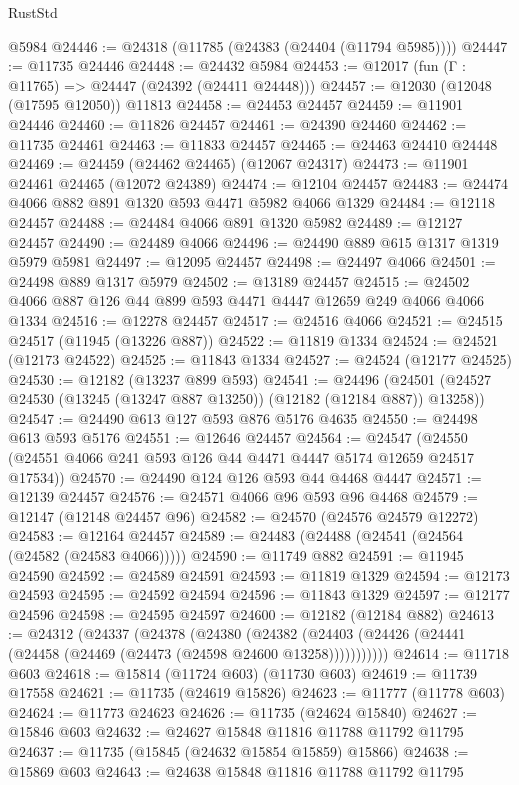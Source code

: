\begin{lexlean}{RustStd}
\begin{coremodule}
    @5984
@24446 := @24318 (@11785 (@24383 (@24404 (@11794 @5985))))
@24447 := @11735 @24446
@24448 := @24432 @5984
@24453 := @12017 (fun (Γ : @11765) => @24447 (@24392 (@24411 @24448)))
@24457 := @12030 (@12048 (@17595 @12050)) @11813
@24458 := @24453 @24457
@24459 := @11901 @24446
@24460 := @11826 @24457
@24461 := @24390 @24460
@24462 := @11735 @24461
@24463 := @11833 @24457
@24465 := @24463 @24410 @24448
@24469 := @24459 (@24462 @24465) (@12067 @24317)
@24473 := @11901 @24461 @24465 (@12072 @24389)
@24474 := @12104 @24457
@24483 := @24474 @4066 @882 @891 @1320 @593 @4471 @5982 @4066 @1329
@24484 := @12118 @24457
@24488 := @24484 @4066 @891 @1320 @5982
@24489 := @12127 @24457
@24490 := @24489 @4066
@24496 := @24490 @889 @615 @1317 @1319 @5979 @5981
@24497 := @12095 @24457
@24498 := @24497 @4066
@24501 := @24498 @889 @1317 @5979
@24502 := @13189 @24457
@24515 := @24502 @4066 @887 @126 @44 @899 @593 @4471 @4447 @12659 @249 @4066 @4066 @1334
@24516 := @12278 @24457
@24517 := @24516 @4066
@24521 := @24515 @24517 (@11945 (@13226 @887))
@24522 := @11819 @1334
@24524 := @24521 (@12173 @24522)
@24525 := @11843 @1334
@24527 := @24524 (@12177 @24525)
@24530 := @12182 (@13237 @899 @593)
@24541 := @24496
    (@24501 (@24527 @24530 (@13245 (@13247 @887 @13250)) (@12182 (@12184 @887)) @13258))
@24547 := @24490 @613 @127 @593 @876 @5176 @4635
@24550 := @24498 @613 @593 @5176
@24551 := @12646 @24457
@24564 := @24547 (@24550 (@24551 @4066 @241 @593 @126 @44 @4471 @4447 @5174 @12659 @24517 @17534))
@24570 := @24490 @124 @126 @593 @44 @4468 @4447
@24571 := @12139 @24457
@24576 := @24571 @4066 @96 @593 @96 @4468
@24579 := @12147 (@12148 @24457 @96)
@24582 := @24570 (@24576 @24579 @12272)
@24583 := @12164 @24457
@24589 := @24483 (@24488 (@24541 (@24564 (@24582 (@24583 @4066)))))
@24590 := @11749 @882
@24591 := @11945 @24590
@24592 := @24589 @24591
@24593 := @11819 @1329
@24594 := @12173 @24593
@24595 := @24592 @24594
@24596 := @11843 @1329
@24597 := @12177 @24596
@24598 := @24595 @24597
@24600 := @12182 (@12184 @882)
@24613 := @24312
    (@24337
      (@24378
        (@24380
          (@24382 (@24403 (@24426 (@24441 (@24458 (@24469 (@24473 (@24598 @24600 @13258)))))))))))
@24614 := @11718 @603
@24618 := @15814 (@11724 @603) (@11730 @603)
@24619 := @11739 @17558
@24621 := @11735 (@24619 @15826)
@24623 := @11777 (@11778 @603)
@24624 := @11773 @24623
@24626 := @11735 (@24624 @15840)
@24627 := @15846 @603
@24632 := @24627 @15848 @11816 @11788 @11792 @11795
@24637 := @11735 (@15845 (@24632 @15854 @15859) @15866)
@24638 := @15869 @603
@24643 := @24638 @15848 @11816 @11788 @11792 @11795

\end{coremodule}
\end{lexlean}
